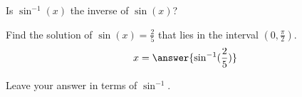 \documentclass{ximera}
\begin{document}
\begin{problem}
	Is $\sin^{-1}(x)$ the inverse of $\sin(x)$?
	\begin{multipleChoice}
	  \end{multipleChoice}
\end{problem}

\begin{problem}
	Find the solution of $\sin(x) = \frac{2}{5}$ that lies in the interval $\left(0, \frac{\pi}{2}\right)$.
	\[ x = \answer{ \sin^{-1}(\frac{2}{5})} \]
\end{problem}
\begin{hint}
	Leave your answer in terms of $\sin^{-1}$.
\end{hint}
%
\end{document}
